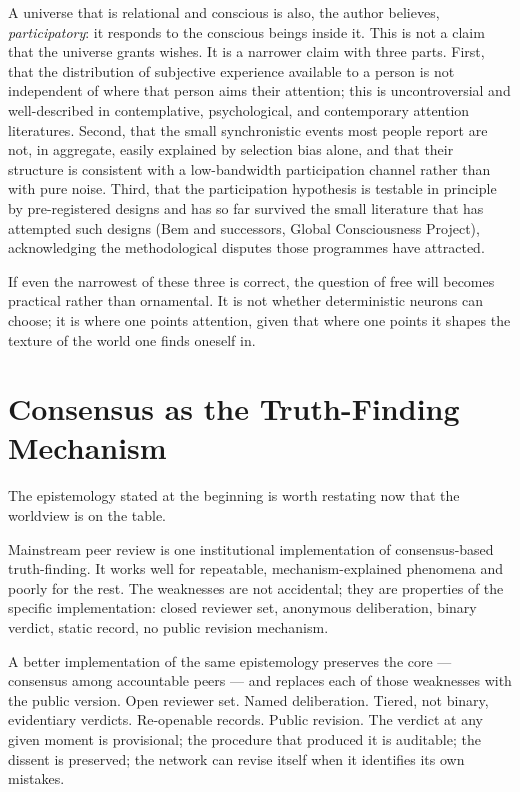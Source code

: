 \documentclass[11pt,a4paper]{article}
\begin{document}
A universe that is relational and conscious is also, the author
believes, \emph{participatory}: it responds to the conscious
beings inside it. This is not a claim that the universe grants
wishes. It is a narrower claim with three parts. First, that the
distribution of subjective experience available to a person is
not independent of where that person aims their attention; this
is uncontroversial and well-described in contemplative,
psychological, and contemporary attention literatures. Second,
that the small synchronistic events most people report are not,
in aggregate, easily explained by selection bias alone, and that
their structure is consistent with a low-bandwidth participation
channel rather than with pure noise. Third, that the participation
hypothesis is testable in principle by pre-registered designs and
has so far survived the small literature that has attempted such
designs (Bem and successors, Global Consciousness Project),
acknowledging the methodological disputes those programmes have
attracted.

If even the narrowest of these three is correct, the question of
free will becomes practical rather than ornamental. It is not
whether deterministic neurons can choose; it is where one points
attention, given that where one points it shapes the texture of
the world one finds oneself in.

\section{Consensus as the Truth-Finding Mechanism}

The epistemology stated at the beginning is worth restating now
that the worldview is on the table.

Mainstream peer review is one institutional implementation of
consensus-based truth-finding. It works well for repeatable,
mechanism-explained phenomena and poorly for the rest. The
weaknesses are not accidental; they are properties of the specific
implementation: closed reviewer set, anonymous deliberation,
binary verdict, static record, no public revision mechanism.

A better implementation of the same epistemology preserves the
core --- consensus among accountable peers --- and replaces each
of those weaknesses with the public version. Open reviewer set.
Named deliberation. Tiered, not binary, evidentiary verdicts.
Re-openable records. Public revision. The verdict at any given
moment is provisional; the procedure that produced it is
auditable; the dissent is preserved; the network can revise itself
when it identifies its own mistakes.
\end{document}
